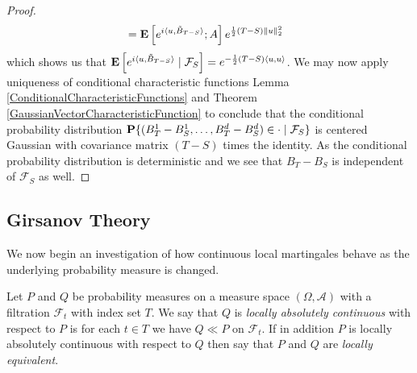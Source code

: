 \begin{proof}
\begin{align*}
&=  \expectation{ e^{i\langle u, \tilde{B}_{T-S} \rangle}; A} e^{\frac{1}{2}(T-S) \norm{u}_2^2}
\end{align*}
which shows us that $\cexpectationlong{\mathcal{F}_S}{e^{i \langle u, \tilde{B}_{T-S} \rangle}} = e^{-\frac{1}{2} (T-S) \langle u, u \rangle}$.  We may now apply uniqueness of conditional characteristic functions Lemma \ref{ConditionalCharacteristicFunctions} and Theorem \ref{GaussianVectorCharacteristicFunction} to conclude that the conditional probability distribution $\cprobability{\mathcal{F}_S}{ (B_{T}^1 - B_S^1,\dotsc, B_{T}^d - B_S^d) \in \cdot}$ is centered Gaussian with covariance matrix $(T-S)$ times the identity. As the conditional probability distribution is deterministic and we see that $B_T -B_S$ is independent of $\mathcal{F}_S$ as well.
\end{proof}

\subsection{Girsanov Theory}

We now begin an investigation of how continuous local martingales behave as the underlying probability measure is changed.  

\begin{defn}Let $P$ and $Q$ be probability measures on a measure space $(\Omega, \mathcal{A})$ with a filtration $\mathcal{F}_t$ with index set $T$.  We say that $Q$ is \emph{locally absolutely continuous} with respect to $P$ is for each $t \in T$ we have $Q \ll P$ on $\mathcal{F}_t$.  If in addition $P$ is locally absolutely continuous with respect to $Q$ then say that $P$ and $Q$ are \emph{locally equivalent}.
\end{defn}

